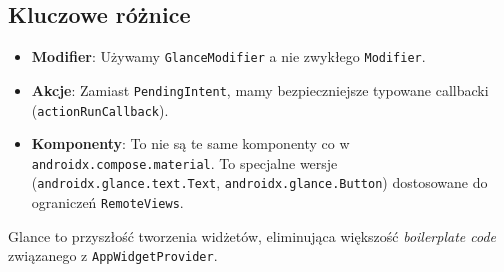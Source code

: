 \subsection{Kluczowe różnice}
\begin{itemize}
    \item \textbf{Modifier}: Używamy \texttt{GlanceModifier} a nie zwykłego \texttt{Modifier}.
    \item \textbf{Akcje}: Zamiast \texttt{PendingIntent}, mamy bezpieczniejsze typowane callbacki (\texttt{actionRunCallback}).
    \item \textbf{Komponenty}: To nie są te same komponenty co w \texttt{androidx.compose.material}. To specjalne wersje (\texttt{androidx.glance.text.Text}, \texttt{androidx.glance.Button}) dostosowane do ograniczeń \texttt{RemoteViews}.
\end{itemize}

Glance to przyszłość tworzenia widżetów, eliminująca większość \textit{boilerplate code} związanego z \texttt{AppWidgetProvider}.
